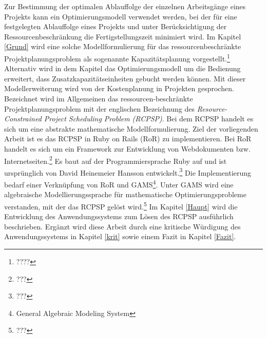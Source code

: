 \documentclass[a4paper,12pt,parskip,bibtotoc,liststotoc]{article}
\begin{document}
Zur Bestimmung der optimalen Ablauffolge der einzelnen Arbeitsgänge eines Projekts kann ein Optimierungsmodell verwendet werden, bei der für eine festgelegten Ablauffolge eines Projekts und unter Berücksichtigung der Ressourcenbeschränkung die Fertigstellungszeit minimiert wird. Im Kapitel \ref{Grund} wird eine solche Modellformulierung für das ressourcenbeschränkte Projektplanungsproblem als sogenannte Kapazitätsplanung vorgestellt.\footnote{????} Alternativ wird in dem Kapitel das Optimierungsmodell um die Bedienung erweitert, dass  Zusatzkapazitätseinheiten gebucht werden können. Mit dieser Modellerweiterung wird von der Kostenplanung in Projekten gesprochen. Bezeichnet wird im Allgemeinen das ressourcen-beschränkte Projektplanungsproblem  mit der englischen Bezeichnung des \textit{Resource-Constrained Project Scheduling Problem (RCPSP)}. Bei dem RCPSP handelt es sich um eine abstrakte mathematische Modellformulierung. Ziel der vorliegenden Arbeit ist es das RCPSP in Ruby on Rails (RoR) zu implementieren. Bei RoR handelt es sich um ein Framework zur Entwicklung von Webdokumenten bzw. Internetseiten.\footnote{???} Es baut auf der Programmiersprache Ruby auf und ist ursprünglich von David Heinemeier Hansson entwickelt.\footnote{???} Die Implementierung bedarf einer Verknüpfung von RoR und GAMS\footnote{General Algebraic Modeling System}. Unter GAMS wird eine algebraische Modellierungssprache für mathematische Optimierungsprobleme verstanden, mit der das RCPSP gelöst wird.\footnote{???} Im Kapitel \ref{Haupt} wird die Entwicklung des Anwendungssystems zum Lösen des RCPSP ausführlich beschrieben. Ergänzt wird diese Arbeit durch eine kritische Würdigung des Anwendungssystems in Kapitel \ref{krit} sowie einem Fazit in Kapitel \ref{Fazit}.
\end{document}
